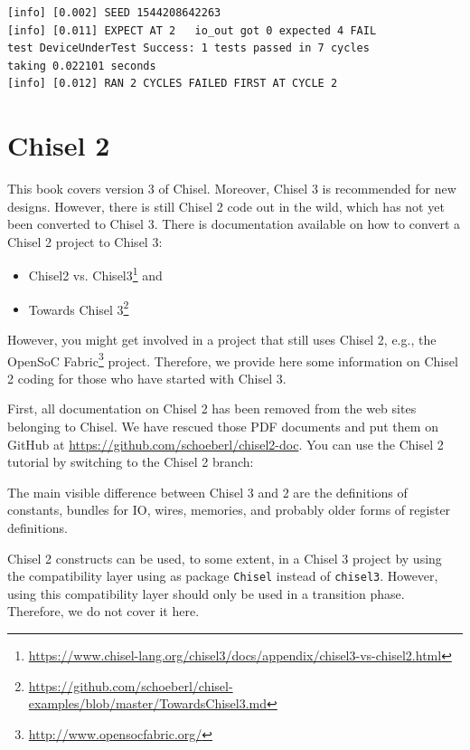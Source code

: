 \documentclass[%
    10pt,
    headinclude, footexclude,
    openright, %
    notitlepage,
    cleardoubleempty,
    headsepline,
    pointlessnumbers,
    bibtotoc, idxtotoc,
    ]{scrbook}
\newcommand{\code}[1]{{\small{\texttt{#1}}}}
\newcommand{\myref}[2]{\href{#1}{#2}}
\renewcommand{\myref}[2]{{#2}{\footnote{\url{#1}}}}
\begin{document}
\begin{verbatim}
[info] [0.002] SEED 1544208642263
[info] [0.011] EXPECT AT 2   io_out got 0 expected 4 FAIL
test DeviceUnderTest Success: 1 tests passed in 7 cycles
taking 0.022101 seconds
[info] [0.012] RAN 2 CYCLES FAILED FIRST AT CYCLE 2
\end{verbatim}



\chapter{Chisel 2}


This book covers version 3 of Chisel. Moreover, Chisel 3 is recommended for new designs.
However, there is still Chisel 2 code out in the wild, which has not yet been converted
to Chisel 3. There is documentation available on how to convert a Chisel 2 project to
Chisel 3:

\begin{itemize}
\item \myref{https://www.chisel-lang.org/chisel3/docs/appendix/chisel3-vs-chisel2.html}{Chisel2 vs. Chisel3} and
\item \myref{https://github.com/schoeberl/chisel-examples/blob/master/TowardsChisel3.md}{Towards Chisel 3}
\end{itemize}

However, you might get involved in a project that still uses Chisel 2,
e.g., the \myref{http://www.opensocfabric.org/}{OpenSoC Fabric} project.
Therefore, we provide here some information on Chisel 2 coding for those who
have started with Chisel 3.

First, all documentation on Chisel 2 has been removed from the web sites
belonging to Chisel. We have rescued those PDF documents and put them
on GitHub at \url{https://github.com/schoeberl/chisel2-doc}.
You can use the Chisel 2 tutorial by switching to the Chisel 2 branch:


The main visible difference between Chisel 3 and 2 are the definitions of
constants, bundles for IO, wires, memories, and probably older forms of register
definitions.

Chisel 2 constructs can be used, to some extent, in a Chisel 3 project by
using the compatibility layer using as package \code{Chisel} instead of \code{chisel3}.
However, using this compatibility layer should only be used in a transition phase.
Therefore, we do not cover it here.
\end{document}
